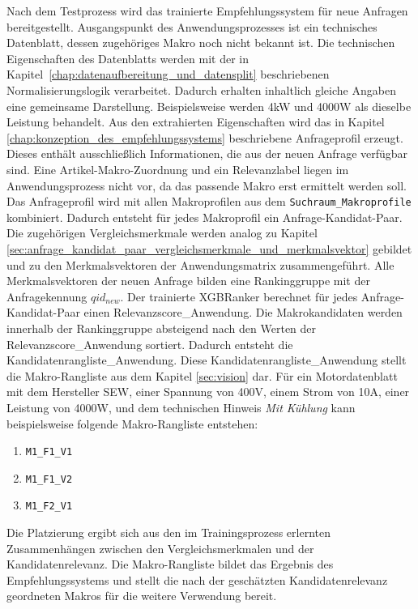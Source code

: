 Nach dem Testprozess wird das trainierte Empfehlungssystem für neue Anfragen bereitgestellt. Ausgangspunkt des Anwendungsprozesses ist ein technisches Datenblatt, dessen zugehöriges Makro noch nicht bekannt ist. 
Die technischen Eigenschaften des Datenblatts werden mit der in Kapitel~\ref{chap:datenaufbereitung_und_datensplit} beschriebenen Normalisierungslogik verarbeitet. 
Dadurch erhalten inhaltlich gleiche Angaben eine gemeinsame Darstellung. Beispielsweise werden 4kW und 4000W als dieselbe Leistung behandelt. 
Aus den extrahierten Eigenschaften wird das in Kapitel \ref{chap:konzeption_des_empfehlungssystems} beschriebene Anfrageprofil erzeugt. Dieses enthält ausschließlich Informationen, die aus der neuen Anfrage verfügbar sind. 
Eine Artikel-Makro-Zuordnung und ein Relevanzlabel liegen im Anwendungsprozess nicht vor, da das passende Makro erst ermittelt werden soll.
Das Anfrageprofil wird mit allen Makroprofilen aus dem \texttt{Suchraum\_Makroprofile} kombiniert. Dadurch entsteht für jedes Makroprofil ein Anfrage-Kandidat-Paar.
Die zugehörigen Vergleichsmerkmale werden analog zu Kapitel \ref{sec:anfrage_kandidat_paar_vergleichsmerkmale_und_merkmalsvektor} gebildet und zu den Merkmalsvektoren der Anwendungsmatrix zusammengeführt. 
Alle Merkmalsvektoren der neuen Anfrage bilden eine Rankinggruppe mit der Anfragekennung \(qid_{new}\). Der trainierte XGBRanker berechnet für jedes Anfrage-Kandidat-Paar einen Relevanzscore\_Anwendung. 
Die Makrokandidaten werden innerhalb der Rankinggruppe absteigend nach den Werten der Relevanzscore\_Anwendung sortiert. Dadurch entsteht die Kandidatenrangliste\_Anwendung.
Diese Kandidatenrangliste\_Anwendung stellt die Makro-Rangliste aus dem Kapitel \ref{sec:vision} dar. 
Für ein Motordatenblatt mit dem Hersteller SEW, einer Spannung von 400V, einem Strom von 10A, einer Leistung von 4000W, 
und dem technischen Hinweis \textit{Mit Kühlung} kann beispielsweise folgende Makro-Rangliste entstehen: 
\begin{enumerate} 
    \item \texttt{M1\_F1\_V1}
    \item \texttt{M1\_F1\_V2}
    \item \texttt{M1\_F2\_V1}
\end{enumerate}

Die Platzierung ergibt sich aus den im Trainingsprozess erlernten Zusammenhängen zwischen den Vergleichsmerkmalen und der Kandidatenrelevanz.
Die Makro-Rangliste bildet das Ergebnis des Empfehlungssystems und stellt die nach der geschätzten Kandidatenrelevanz geordneten Makros für die weitere Verwendung bereit.


